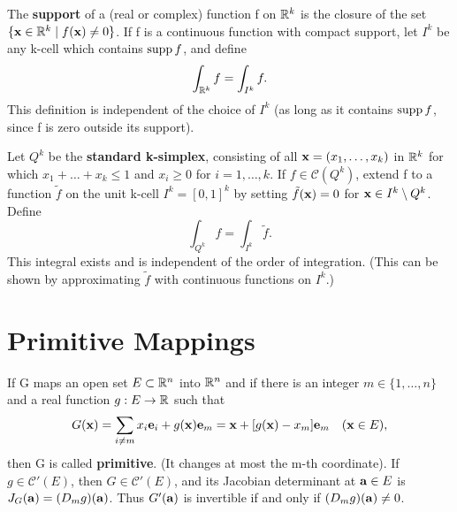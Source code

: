 \begin{definition}
  \label{def:chap10:integral_Rk_compact_support}
  The \textbf{support} of a (real or complex) function f on $\mathbb{R}^k$ is
  the closure of the set $\{ \mathbf{x} \in \mathbb{R}^k \mid f(\mathbf{x}) \ne 0 \}$.
  If f is a continuous function with compact support, let $I^k$ be
  any k-cell which contains $\operatorname{supp} f$, and define
  \[
    \int_{\mathbb{R}^k} f = \int_{I^k} f.
  \]
  This definition is independent of the choice of $I^k$ (as long as
  it contains $\operatorname{supp} f$, since f is zero outside its support).
\end{definition}


\begin{example}
  \label{ex:chap10:integral_simplex}
  Let $Q^k$ be the \textbf{standard k-simplex}, consisting of all
  $\mathbf{x}=(x_1, \dots, x_k)$ in $\mathbb{R}^k$ for which $x_1 + \dots + x_k
  \le 1$ and $x_i \ge 0$ for $i=1, \dots, k$.
  If $f \in \mathcal{C}(Q^k)$, extend f to a function $\tilde{f}$ on
  the unit k-cell $I^k = [0, 1]^k$ by setting $\tilde{f}(\mathbf{x}) =
  0$ for $\mathbf{x} \in I^k \setminus Q^k$. Define
  \[
    \int_{Q^k} f = \int_{I^k} \tilde{f}.
  \]
  This integral exists and is independent of the order of
  integration. (This can be shown by approximating $\tilde{f}$ with
  continuous functions on $I^k$.)
\end{example}



\section{Primitive Mappings}

\begin{definition}
  \label{def:chap10:primitive_mapping}
  If G maps an open set $E \subset \mathbb{R}^n$ into $\mathbb{R}^n$ and if there is
  an integer $m \in \{1, \dots, n\}$ and a real function
  $g: E \to \mathbb{R}$ such that
  \[
    G(\mathbf{x}) = \sum_{i \ne m} x_i \mathbf{e}_i + g(\mathbf{x})
    \mathbf{e}_m = \mathbf{x} + [g(\mathbf{x}) - x_m] \mathbf{e}_m \quad
    (\mathbf{x} \in E),
  \]
  then G is called \textbf{primitive}. (It changes at most the m-th coordinate).
  If $g \in \mathcal{C}'(E)$, then $G \in \mathcal{C}'(E)$, and its
  Jacobian determinant at $\mathbf{a} \in E$ is $J_G(\mathbf{a}) = (D_m
  g)(\mathbf{a})$. Thus $G'(\mathbf{a})$ is invertible if and only if
  $(D_m g)(\mathbf{a}) \ne 0$.
\end{definition}


